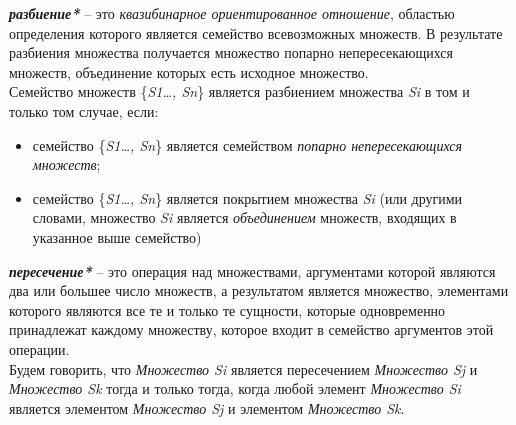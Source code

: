 	
\textbf{\textit{разбиение*}} – это \textit{квазибинарное ориентированное отношение}, областью определения которого является семейство всевозможных множеств. В результате разбиения множества получается множество попарно непересекающихся множеств, объединение которых есть исходное множество.\\
Семейство множеств \{\textit{S1…, Sn}\} является разбиением множества \textit{Si} в том и только том случае, если:
\begin{itemize}
		\item семейство \{\textit{S1…, Sn}\} является семейством \textit{попарно непересекающихся множеств};
		\item семейство \{\textit{S1…, Sn}\} является покрытием множества \textit{Si} (или другими словами, множество \textit{Si} является \textit{объединением} множеств, входящих в указанное выше семейство)
\end{itemize}




\textbf{\textit{пересечение*}} – это операция над множествами, аргументами которой являются два или большее число множеств, а результатом является множество, элементами которого являются все те и только те сущности, которые одновременно принадлежат каждому множеству, которое входит в семейство аргументов этой операции.\\
	Будем говорить, что \textit{Множество Si} является пересечением \textit{Множество Sj} и \textit{Множество Sk} тогда и только тогда, когда любой элемент \textit{Множество Si} является элементом \textit{Множество Sj} и элементом \textit{Множество Sk}.




